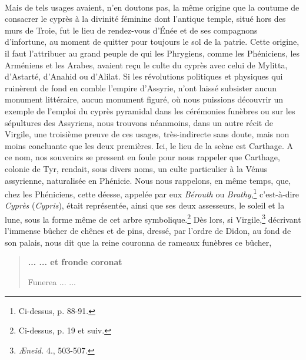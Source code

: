 \documentclass{article}
\begin{document}
\paragraph{}
Mais de tels usages avaient, n'en doutons pas, la même origine que la coutume de consacrer le cyprès à la divinité féminine dont l'antique temple, situé hors des murs de Troie, fut le lieu de rendez-vous d'Énée et de ses compagnons d'infortune, au moment de quitter pour toujours le sol de la patrie. Cette origine, il faut l'attribuer au grand peuple de qui les Phrygiens, comme les Phéniciens, les Arméniens et les Arabes, avaient reçu le culte du cyprès avec celui de Mylitta, d'Astarté, d'Anahid ou d'Alilat. Si les révolutions politiques et physiques qui ruinèrent de fond en comble l'empire d'Assyrie, n'ont laissé subsister aucun monument littéraire, aucun monument figuré, où nous puissions découvrir un exemple de l'emploi du cyprès pyramidal dans les cérémonies funèbres ou sur les sépultures des Assyriens, nous trouvons néanmoins, dans un autre récit de Virgile, une troisième preuve de ces usages, très-indirecte sans doute, mais non moins concluante que les deux premières. Ici, le lieu de la scène est Carthage. A ce nom, nos souvenirs se pressent en foule pour nous rappeler que Carthage, colonie de Tyr, rendait, sous divers noms, un culte particulier à la Vénus assyrienne, naturalisée en Phénicie. Nous nous rappelons, en même temps, que, chez les Phéniciens, cette déesse, appelée par eux \emph{Bérouth} ou \emph{Brathy},\footnote{Ci-dessus, p. 88-91.} c'est-à-dire \emph{Cyprès} (\emph{Cypris}), était représentée, ainsi que ses deux assesseurs, le soleil et la lune, sous la forme même de cet arbre symbolique.\footnote{Ci-dessus, p. 19 et suiv.} Dès lors, si Virgile,\footnote{\emph{Æneid.} 4., 503-507.} décrivant l'immense bûcher de chênes et de pins, dressé, par l'ordre de Didon, au fond de son palais, nous dit que la reine couronna de rameaux funèbres ce bûcher,

\begin{quotation}\scriptsize\bfseries
... ... et fronde coronat

Funerea ... ...
\end{quotation}
\end{document}
